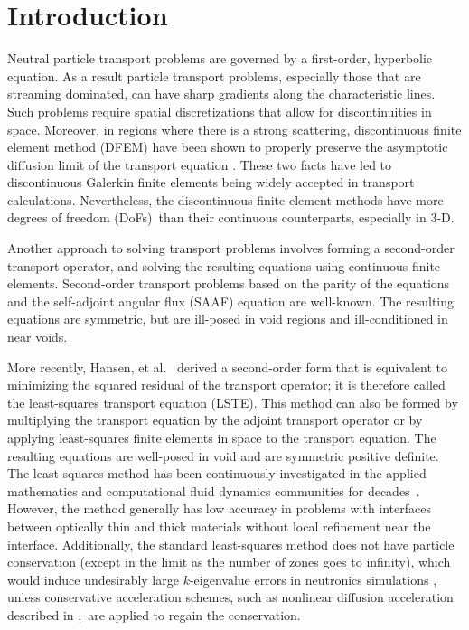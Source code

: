 \documentclass[review]{elsarticle}
\begin{document}
\linenumbers

\section{Introduction}
Neutral particle transport problems are governed by a first-order, hyperbolic equation.  As a result particle transport problems, especially those that are streaming dominated, can have {sharp gradients along the characteristic lines}. Such problems require spatial discretizations that allow for discontinuities in space.  Moreover, in regions where there is a strong scattering, discontinuous finite element method (DFEM) have been shown to properly preserve the asymptotic diffusion limit of the transport equation \cite{adams2001discontinuous}.  These two facts have led to discontinuous Galerkin finite elements being widely {accepted} in transport calculations. Nevertheless, the discontinuous finite element methods have more degrees of freedom {(DoFs)}\ than their continuous counterparts, especially in 3-D. 

Another approach to solving transport problems involves forming a second-order transport operator, and solving the resulting equations using continuous finite elements. Second-order transport problems based on the parity of the equations and the self-adjoint angular flux (SAAF) equation are well-known\cite{morel_saaf,gesh_dissertation,gesh_mc,yunhuang_dissertation,zheng_dissertation}. The resulting equations are symmetric, but are ill-posed in void regions and ill-conditioned in near voids.  

More recently, Hansen, et al.~\cite{Hansen:2015jq} derived a second-order form that is equivalent to minimizing the squared residual of the transport operator; it is therefore called the least-squares transport equation (LSTE).  This method can also be formed by multiplying the transport equation by the adjoint transport operator or by applying least-squares finite elements in space to the transport equation.  The resulting equations are well-posed in void and are symmetric positive definite. The least-squares method has been continuously investigated  in the {applied mathematics} and computational fluid dynamics communities {for decades}\ \cite{ls-60s,ls-70s,ls-80s,lowrie_l1,guermond_l1,bochev-ls}. However, the method generally has low accuracy in problems with interfaces between optically thin and thick materials without local refinement near the interface\cite{zheng_l1sn,zheng_l1pn,clifmc}. Additionally, the standard least-squares method does not have particle conservation (except in the limit as the number of zones goes to infinity), which {would induce undesirably large $k$-eigenvalue errors in neutronics simulations} \cite{laboure:2016}, unless {conservative acceleration schemes, such as nonlinear diffusion acceleration described in \cite{morel_holo,park-nda,yaqi_void},}\ are applied to {regain the conservation}.
\end{document}
